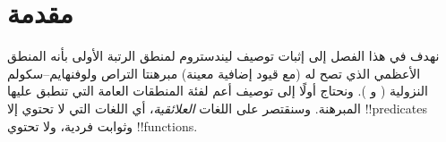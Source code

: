 \documentclass[../../../include/open-logic-section]{subfiles}
\begin{document}
\section{مقدمة}

نهدف في هذا الفصل إلى إثبات توصيف ليندستروم لمنطق الرتبة الأولى بأنه
المنطق الأعظمي الذي تصح له (مع قيود إضافية معينة) مبرهنتا التراص
ولوفنهايم--سكولم النزولية
( و
). ونحتاج أولًا إلى توصيف أعم
لفئة المنطقات العامة التي تنطبق عليها المبرهنة. وسنقتصر على اللغات
\emph{العلائقية}، أي اللغات التي لا تحتوي إلا !!{predicate}s وثوابت
فردية، ولا تحتوي !!{function}s.
\end{document}
